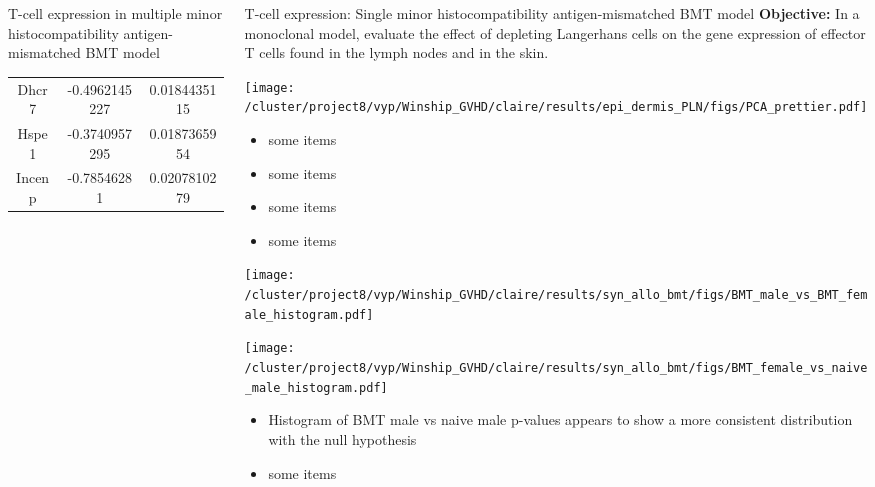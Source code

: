 \documentclass[final,hyperref={pdfpagelabels=false}]{beamer}
\begin{document}
\begin{frame}{}
\begin{columns}[t]
\begin{column}{.24\linewidth}
\begin{block}{T-cell expression in multiple minor histocompatibility antigen-mismatched BMT model}
{\begin{tabular}{ |c|c|c| }
		Dhcr7 	& -0.4962145227	& 0.0184435115 \\
		Hspe1 	& -0.3740957295	& 0.0187365954 \\
		Incenp 	& -0.78546281	& 0.0207810279 \\
	      \hline
	    \end{tabular} }

        \end{block}
      \end{column}
      \begin{column}{.25\linewidth}
        \begin{block}{T-cell expression: Single minor histocompatibility antigen-mismatched BMT model}
	  {\bf Objective:} In a monoclonal model, evaluate the effect of depleting Langerhans cells on the gene expression of effector T cells found in the lymph nodes and in the skin.
	  \begin{center}
	   \texttt{[image: /cluster/project8/vyp/Winship\_GVHD/claire/results/epi\_dermis\_PLN/figs/PCA\_prettier.pdf]}
            \end{center}
{\small          \begin{itemize}
          \item some items
          \item some items
          \item some items
          \item some items
          \end{itemize}}
	  \begin{minipage}{0.45\textwidth}
            \texttt{[image: /cluster/project8/vyp/Winship\_GVHD/claire/results/syn\_allo\_bmt/figs/BMT\_male\_vs\_BMT\_female\_histogram.pdf]}
          \end{minipage}
          \begin{minipage}{0.45\textwidth}
            \texttt{[image: /cluster/project8/vyp/Winship\_GVHD/claire/results/syn\_allo\_bmt/figs/BMT\_female\_vs\_naive\_male\_histogram.pdf]}
          \end{minipage}
{\small	  \begin{itemize}
	    \item Histogram of BMT male vs naive male p-values appears to show a more consistent distribution with the null hypothesis 
	    \item some items
	   \end{itemize}}
	  \begin{minipage}{0.45\textwidth}

\end{minipage}
\end{block}
\end{column}
\end{columns}
\end{frame}
\end{document}
